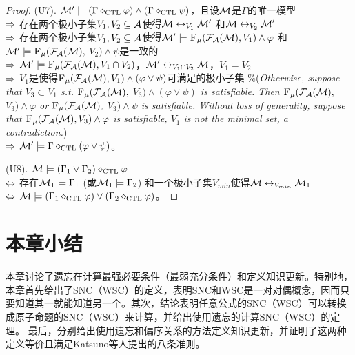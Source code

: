 \begin{proof}
	
	
	(U7). ${\cal M}' \models (\Gamma \diamond_{\textrm{CTL}} \varphi) \wedge (\Gamma \diamond_{\textrm{CTL}} \psi)$，且设${\cal M}$是$\Gamma$的唯一模型\\
	$\Rightarrow$ 存在两个极小子集$V_1, V_2 \subseteq {\cal A}$使得${\cal M} \leftrightarrow_{V_1} {\cal M}'$ 和${\cal M} \leftrightarrow_{V_2} {\cal M}'$\\
	$\Rightarrow$ 存在两个极小子集$V_1, V_2 \subseteq {\cal A}$使得${\cal M}' \models {\textsc{F}_{\textsc{$\mu$}}}({\cal F}_{{\cal A}}({\cal M}), V_1) \wedge \varphi$ 和 ${\cal M}' \models {\textsc{F}_{\textsc{$\mu$}}}({\cal F}_{{\cal A}}({\cal M}),$ $V_2) \wedge \psi$是一致的\\
	$\Rightarrow$ ${\cal M}' \models {\textsc{F}_{\textsc{$\mu$}}}({\cal F}_{{\cal A}}({\cal M}), V_1 \cap V_2)$，${\cal M}' \leftrightarrow_{V_1 \cap V_2} {\cal M}$，$V_1 = V_2$\\
	$\Rightarrow$  $V_1$是使得${\textsc{F}_{\textsc{$\mu$}}}({\cal F}_{{\cal A}}({\cal M}), V_1) \wedge (\varphi \vee \psi)$可满足的极小子集 \qquad  \textcolor[RGB]{0,134,139}{$\%$({\em Otherwise, suppose that $V_3\subset V_1$ s.t. ${\textsc{F}_{\textsc{$\mu$}}}({\cal F}_{{\cal A}}({\cal M}),$ $V_3) \wedge (\varphi \vee \psi)$ is satisfiable. Then ${\textsc{F}_{\textsc{$\mu$}}}({\cal F}_{{\cal A}}({\cal M}),$ $V_3) \wedge \varphi$ or ${\textsc{F}_{\textsc{$\mu$}}}({\cal F}_{{\cal A}}({\cal M}),$ $V_3) \wedge \psi$ is satisfiable. Without loss of generality, suppose that ${\textsc{F}_{\textsc{$\mu$}}}({\cal F}_{{\cal A}}({\cal M}), V_3) \wedge \varphi$ is satisfiable, $V_1$ is not the minimal set, a contradiction.})}\\
	$\Rightarrow$ ${\cal M}' \models \Gamma \diamond_{\textrm{CTL}} (\varphi \vee \psi)$。
	
	
	
	(U8). ${\cal M} \models (\Gamma_1 \vee \Gamma_2) \diamond_{\textrm{CTL}} \varphi$ \\
	$\Leftrightarrow$ 存在${\cal M}_1 \models \Gamma_1$ (或${\cal M}_1 \models \Gamma_2$) 和一个极小子集$V_{min}$使得${\cal M} \leftrightarrow_{V_{min}} {\cal M}_1$\\
	$\Leftrightarrow$ ${\cal M} \models (\Gamma_1 \diamond_{\textrm{CTL}} \varphi) \vee (\Gamma_2 \diamond_{\textrm{CTL}} \varphi)$。
\end{proof}



\section{本章小结}\label{sec:chapter04-conclusion}

本章讨论了遗忘在计算最强必要条件（最弱充分条件）和定义知识更新。特别地，本章首先给出了SNC（WSC）的定义，表明SNC和WSC是一对对偶概念，因而只要知道其一就能知道另一个。其次，结论表明任意公式的SNC（WSC）可以转换成原子命题的SNC（WSC）来计算，并给出使用遗忘的计算SNC（WSC）的定理。
最后，分别给出使用遗忘和偏序关系的方法定义知识更新，并证明了这两种定义等价且满足Katsuno等人提出的八条准则。

